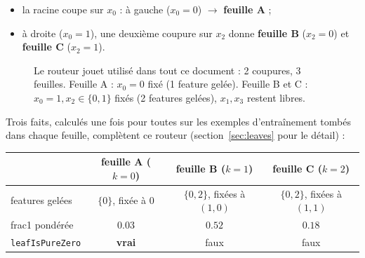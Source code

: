 \documentclass[12pt,a4paper]{article}
\newcommand{\code}[1]{\texttt{#1}}
\theoremstyle{remark}
\begin{document}
\begin{itemize}
  \item la racine coupe sur $x_0$ : à gauche ($x_0{=}0$) $\to$ \textbf{feuille A} ;
  \item à droite ($x_0{=}1$), une deuxième coupure sur $x_2$ donne
        \textbf{feuille B} ($x_2{=}0$) et \textbf{feuille C} ($x_2{=}1$).
\end{itemize}

\begin{figure}[h]
\centering
{}
\caption{Le routeur jouet utilisé dans tout ce document : 2 coupures, 3 feuilles.
Feuille A : $x_0{=}0$ fixé (1 feature gelée). Feuille B et C : $x_0{=}1,x_2{\in}\{0,1\}$
fixés (2 features gelées), $x_1,x_3$ restent libres.}
\label{fig:toy-tree}
\end{figure}

Trois faits, calculés une fois pour toutes sur les exemples d'entraînement tombés
dans chaque feuille, complètent ce routeur (section~\ref{sec:leaves} pour le détail) :

\begin{center}
\renewcommand{\arraystretch}{1.25}
\begin{tabular}{lccc}
\toprule
 & \textbf{feuille A} ($k{=}0$) & \textbf{feuille B} ($k{=}1$) & \textbf{feuille C} ($k{=}2$) \\
\midrule
features gelées & $\{0\}$, fixée à $0$ & $\{0,2\}$, fixées à $(1,0)$ & $\{0,2\}$, fixées à $(1,1)$ \\
frac1 pondérée  & $0.03$ & $0.52$ & $0.18$ \\
\code{leafIsPureZero} & \textbf{vrai} & faux & faux \\
\bottomrule
\end{tabular}
\end{center}
\end{document}
